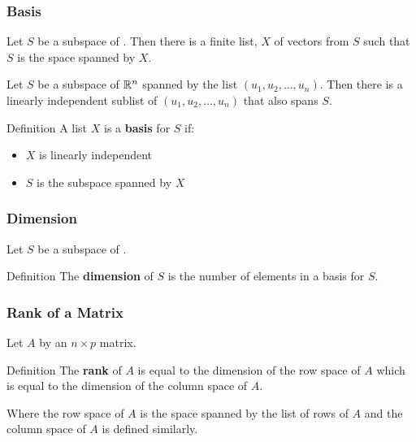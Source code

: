 \documentclass{beamer}
\begin{document}
\begin{frame}
  \frametitle{Basis}

Let $S$ be a subspace of \RealN.  Then there is a finite list, $X$ of vectors from $S$ such that $S$ is the space spanned by $X$.
\medskip

Let $S$ be a subspace of $\mathbb{R}^n$ spanned by the list $(u_1, u_2, \ldots, u_n)$. Then  there is a linearly independent sublist of $(u_1, u_2, \ldots, u_n)$ that also spans $S$.
\medskip

\begin{block}{Definition}
A list $X$ is a \textbf{basis} for $S$ if:
\begin{itemize}
\item $X$ is linearly independent
\item $S$ is the subspace spanned by $X$
\end{itemize}
\end{block}

\end{frame}

\begin{frame}
  \frametitle{Dimension}
Let $S$ be a subspace of \RealN. 
\bigskip

\begin{block}{Definition}
The \textbf{dimension} of $S$ is the number of elements in a basis for $S$.
\end{block}

\end{frame}


\begin{frame}
  \frametitle{Rank of a Matrix}
Let $A$ by an $n \times p$ matrix.
\bigskip

\begin{block}{Definition}
The \textbf{rank} of $A$ is equal to the dimension of the row space of $A$ which is equal to the dimension of the column space of $A$.
\end{block}
\bigskip
Where the row space of $A$ is the space spanned by the list of rows of $A$ and the column space of $A$ is defined similarly.

\end{frame}
\end{document}
